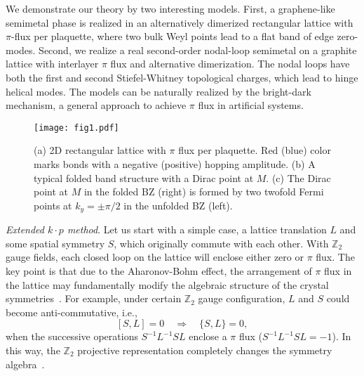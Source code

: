 \documentclass[aps,prl,twocolumn,noshowpacs,superscriptaddress]{revtex4-1}
\def \Z {\mathbb{Z}}
\begin{document}
We demonstrate our theory by two interesting models. First, a graphene-like semimetal phase is realized in an alternatively dimerized rectangular lattice with $\pi$-flux per plaquette, where two bulk Weyl points lead to a flat band of edge zero-modes. Second, we realize a real second-order nodal-loop semimetal on a graphite lattice with interlayer $\pi$ flux and alternative dimerization. The nodal loops have both the first and second Stiefel-Whitney topological charges, which lead to hinge helical modes. The models can be naturally realized by the bright-dark mechanism, a general approach to achieve $\pi$ flux in artificial systems. 



\begin{figure}
	\texttt{[image: fig1.pdf]}
	\caption{(a) 2D rectangular lattice with $\pi$ flux per plaquette. Red (blue) color marks bonds with a negative (positive) hopping amplitude. (b) A typical folded band structure with a Dirac point at $M$. (c) The Dirac point at $M$ in the folded BZ (right) is formed by two twofold Fermi points at $k_y=\pm\pi/2$ in the unfolded BZ (left). \label{Fig1}}
\end{figure}

{\color{blue}\textit{Extended $k\cdot p$ method}.}  Let us start with a simple case, a lattice translation $L$ and some spatial symmetry $S$, which originally commute with each other.
With $\Z_2$ gauge fields, each closed loop on the lattice will enclose either zero or $\pi$ flux. The key point is that
due to the Aharonov-Bohm effect, the arrangement of $\pi$ flux in the lattice may fundamentally modify the algebraic structure of the crystal symmetries~\cite{Zhao2020-1,Zhao2020-2,Moore2020}.  For example,  under certain $\Z_2$ gauge configuration, $L$ and $S$ could become anti-commutative, i.e.,
\begin{equation}\label{S-L}
[S, L]=0 \quad \Rightarrow\quad \{S,L\}=0,
\end{equation}
when the successive operations $S^{-1}L^{-1}SL$ enclose a $\pi$ flux ($S^{-1}L^{-1}SL=-1$). In this way, the $\Z_2$ projective representation completely changes the symmetry algebra~\cite{Note_Z2-extension}.
\end{document}
